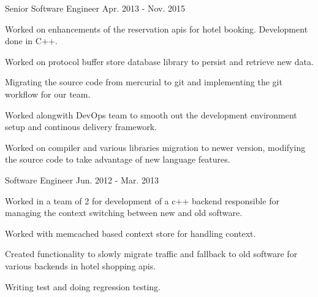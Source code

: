 \begin{cventries}
  \cventry
    {Senior Software Engineer} %
    {} %
    {} %
    {Apr. 2013 - Nov. 2015} %
    {
      \begin{cvitems} %
        \item {Worked on enhancements of the reservation apis for hotel booking. Development done in C++.}
        \item {Worked on protocol buffer store database library to persist and retrieve new data.}
        \item {Migrating the source code from mercurial to git and implementing the git workflow for our team. }
        \item {Worked alongwith DevOps team to smooth out the development environment setup and continous delivery framework.}
        \item {Worked on compiler and various libraries migration to newer version, modifying the source code to take advantage of new language features.}
      \end{cvitems}
    }

  \cventry
    {Software Engineer} %
    {} %
    {} %
    {Jun. 2012 - Mar. 2013} %
    {
      \begin{cvitems} %
        \item {Worked in a team of 2 for development of a c++ backend responsible for managing the context switching between new and old software.}
        \item {Worked with memcached based context store for handling context.}
        \item {Created functionality to slowly migrate traffic and fallback to old software for various backends in hotel shopping apis.}
        \item {Writing test and doing regression testing.}
      \end{cvitems}
    }


\end{cventries}
